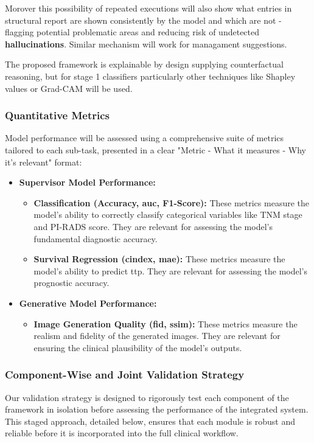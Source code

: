 \documentclass[11pt, a4paper]{article}
\begin{document}
Morover this possibility of repeated executions will also show what entries in structural report are shown consistently by the model and which are not - flagging potential problematic areas and reducing risk of undetected \textbf{hallucinations}.  Similar mechanism will work for managament suggestions. 

The proposed framework is explainable by design supplying counterfactual reasoning, but for stage 1 classifiers particularly other techniques like Shapley values or Grad-CAM will be used. 

\subsubsection{Quantitative Metrics}
Model performance will be assessed using a comprehensive suite of metrics tailored to each sub-task, presented in a clear "Metric - What it measures - Why it's relevant" format:
\begin{itemize}
    \item \textbf{Supervisor Model Performance:}
        \begin{itemize}
            \item \textbf{Classification (Accuracy, \gls{auc}, F1-Score):} These metrics measure the model's ability to correctly classify categorical variables like TNM stage and PI-RADS score. They are relevant for assessing the model's fundamental diagnostic accuracy.
            \item \textbf{Survival Regression (\gls{cindex}, \gls{mae}):} These metrics measure the model's ability to predict \gls{ttp}. They are relevant for assessing the model's prognostic accuracy.
        \end{itemize}
    \item \textbf{Generative Model Performance:}
        \begin{itemize}
            \item \textbf{Image Generation Quality (\gls{fid}, \gls{ssim}):} These metrics measure the realism and fidelity of the generated images. They are relevant for ensuring the clinical plausibility of the model's outputs.

        \end{itemize}
\end{itemize}

\subsubsection{Component-Wise and Joint Validation Strategy}
Our validation strategy is designed to rigorously test each component of the framework in isolation before assessing the performance of the integrated system. This staged approach, detailed below, ensures that each module is robust and reliable before it is incorporated into the full clinical workflow.
\end{document}
